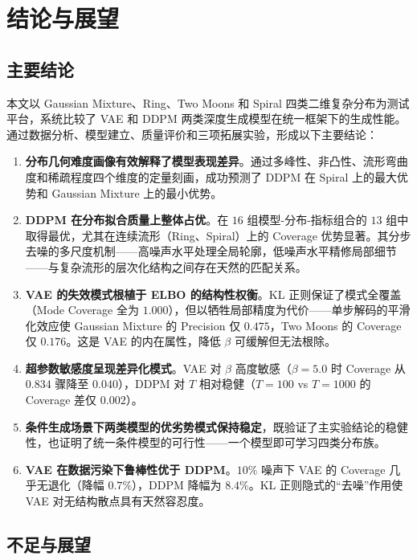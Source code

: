 \documentclass[10pt, a4paper, oneside]{ctexart}
\numberwithin{equation}{section}
\numberwithin{table}{section}
\numberwithin{figure}{section}
\begin{document}
\section{结论与展望}

\subsection{主要结论}

本文以 Gaussian Mixture、Ring、Two Moons 和 Spiral 四类二维复杂分布为测试平台，系统比较了 VAE 和 DDPM 两类深度生成模型在统一框架下的生成性能。通过数据分析、模型建立、质量评价和三项拓展实验，形成以下主要结论：

\begin{enumerate}[label=(\arabic*)]
    \item \textbf{分布几何难度画像有效解释了模型表现差异}。通过多峰性、非凸性、流形弯曲度和稀疏程度四个维度的定量刻画，成功预测了 DDPM 在 Spiral 上的最大优势和 Gaussian Mixture 上的最小优势。
    \item \textbf{DDPM 在分布拟合质量上整体占优}。在 $16$ 组模型-分布-指标组合的 $13$ 组中取得最优，尤其在连续流形（Ring、Spiral）上的 Coverage 优势显著。其分步去噪的多尺度机制——高噪声水平处理全局轮廓，低噪声水平精修局部细节——与复杂流形的层次化结构之间存在天然的匹配关系。
    \item \textbf{VAE 的失效模式根植于 ELBO 的结构性权衡}。KL 正则保证了模式全覆盖（Mode Coverage 全为 $1.000$），但以牺牲局部精度为代价——单步解码的平滑化效应使 Gaussian Mixture 的 Precision 仅 $0.475$，Two Moons 的 Coverage 仅 $0.176$。这是 VAE 的内在属性，降低 $\beta$ 可缓解但无法根除。
    \item \textbf{超参数敏感度呈现差异化模式}。VAE 对 $\beta$ 高度敏感（$\beta=5.0$ 时 Coverage 从 $0.834$ 骤降至 $0.040$），DDPM 对 $T$ 相对稳健（$T=100$ vs $T=1000$ 的 Coverage 差仅 $0.002$）。
    \item \textbf{条件生成场景下两类模型的优劣势模式保持稳定}，既验证了主实验结论的稳健性，也证明了统一条件模型的可行性——一个模型即可学习四类分布族。
    \item \textbf{VAE 在数据污染下鲁棒性优于 DDPM}。$10\%$ 噪声下 VAE 的 Coverage 几乎无退化（降幅 $0.7\%$），DDPM 降幅为 $8.4\%$。KL 正则隐式的“去噪”作用使 VAE 对无结构散点具有天然容忍度。
\end{enumerate}

\subsection{不足与展望}
\end{document}
